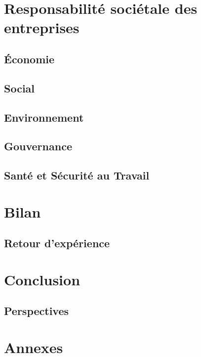 \documentclass[12pt, oneside, a4paper, titlepage]{report}
\begin{document}
\chapter{Responsabilité sociétale des entreprises}%
\label{cha:rse}

\section{Économie}%
\label{sec:rse::eco}

\section{Social}%
\label{sec:rse::social}

\section{Environnement}%
\label{sec:rse::env}

\section{Gouvernance}%
\label{sec:rse::gouv}

\section{Santé et Sécurité au Travail}%
\label{sec:rse::sst}


\chapter{Bilan}%
\label{cha:bilan}

\section{Retour d'expérience}%
\label{sec:bilan::ret-exp}


\chapter{Conclusion}%
\label{cha:conclu}

\section{Perspectives}%
\label{sec:conclu::persp}


\chapter{Annexes}%
\label{cha:annexes}
\end{document}
